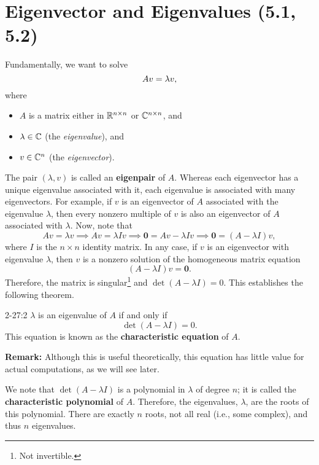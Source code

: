 \documentclass[letterpaper]{article}
\newcommand{\0}{\mathbf{0}}
\begin{document}
\section{Eigenvector and Eigenvalues (5.1, 5.2)}
Fundamentally, we want to solve \begin{equation}{\label{eq:2-27:1}}
    Av = \lambda v,
\end{equation} where
\begin{itemize}
    \item $A$ is a matrix either in $\mathbb{R}^{n \times n}$ or $\mathbb{C}^{n \times n}$, and 
    \item $\lambda \in \mathbb{C}$ (the \emph{eigenvalue}), and 
    \item $v \in \mathbb{C}^n$ (the \emph{eigenvector}).
\end{itemize}
The pair $(\lambda, v)$ is called an \textbf{eigenpair} of $A$. Whereas each eigenvector has a unique eigenvalue associated with it, each eigenvalue is associated with many eigenvectors. For example, if $v$ is an eigenvector of $A$ associated with the eigenvalue $\lambda$, then every nonzero multiple of $v$ is also an eigenvector of $A$ associated with $\lambda$. Now, note that 
\[Av = \lambda v \implies Av = \lambda I v \implies \0 = Av - \lambda I v \implies  \0 = (A - \lambda I)v,\]
where $I$ is the $n \times n$ identity matrix. In any case, if $v$ is an eigenvector with eigenvalue $\lambda$, then $v$ is a nonzero solution of the homogeneous matrix equation \[(A - \lambda I)v = \0.\] Therefore, the matrix is singular\footnote{Not invertible.} and $\det(A - \lambda I) = 0$. This establishes the following theorem. 

\begin{theorem}{}{2-27:2}
    $\lambda$ is an eigenvalue of $A$ if and only if 
    \[\det(A - \lambda I) = 0.\]
    This equation is known as the \textbf{characteristic equation} of $A$.
\end{theorem}
\textbf{Remark:} Although this is useful theoretically, this equation has little value for actual computations, as we will see later. 

We note that $\det(A - \lambda I)$ is a polynomial in $\lambda$ of degree $n$; it is called the \textbf{characteristic polynomial} of $A$. Therefore, the eigenvalues, $\lambda$, are the roots of this polynomial. There are exactly $n$ roots, not all real (i.e., some complex), and thus $n$ eigenvalues.
\end{document}

